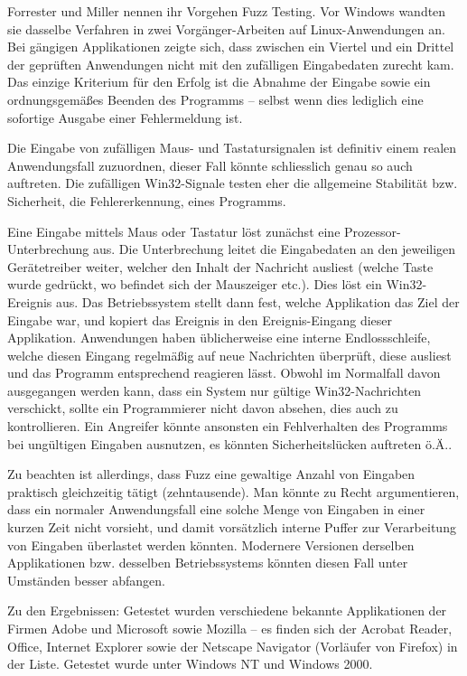 Forrester und Miller nennen ihr Vorgehen \glqq{}Fuzz Testing\grqq{}. Vor Windows wandten sie dasselbe Verfahren
in zwei Vorgänger-Arbeiten auf Linux-Anwendungen an. Bei gängigen Applikationen zeigte sich, dass zwischen
ein Viertel und ein Drittel der geprüften Anwendungen nicht mit den zufälligen Eingabedaten zurecht kam.
Das einzige Kriterium für den \glqq{}Erfolg\grqq{} ist die Abnahme der Eingabe sowie ein ordnungsgemäßes Beenden
des Programms -- selbst wenn dies lediglich eine sofortige Ausgabe einer Fehlermeldung ist.

Die Eingabe von zufälligen Maus- und Tastatursignalen ist definitiv einem realen Anwendungsfall zuzuordnen,
dieser Fall könnte schliesslich genau so auch auftreten. Die zufälligen Win32-Signale testen eher die
allgemeine Stabilität bzw. Sicherheit, die Fehlererkennung, eines Programms.

Eine Eingabe mittels Maus oder Tastatur löst zunächst eine Prozessor-Unterbrechung aus. Die Unterbrechung
leitet die Eingabedaten an den jeweiligen Gerätetreiber weiter, welcher den Inhalt der Nachricht ausliest
(welche Taste wurde gedrückt, wo befindet sich der Mauszeiger etc.). Dies löst ein Win32-Ereignis
aus. Das Betriebssystem stellt dann fest, welche Applikation das Ziel der Eingabe war, und kopiert
das Ereignis in den Ereignis-Eingang dieser Applikation. Anwendungen haben üblicherweise eine interne
Endlossschleife, welche diesen Eingang regelmäßig auf neue Nachrichten überprüft, diese ausliest und das
Programm entsprechend reagieren lässt. Obwohl im Normalfall davon ausgegangen werden kann, dass ein System
nur gültige Win32-Nachrichten verschickt, sollte ein Programmierer nicht davon absehen, dies auch
zu kontrollieren. Ein Angreifer könnte ansonsten ein Fehlverhalten des Programms bei ungültigen Eingaben
ausnutzen, es könnten Sicherheitslücken auftreten ö.Ä..

Zu beachten ist allerdings, dass \glqq{}Fuzz\grqq{} eine gewaltige Anzahl von Eingaben praktisch gleichzeitig tätigt
(zehntausende). Man könnte zu Recht argumentieren, dass ein normaler Anwendungsfall eine solche Menge von
Eingaben in einer kurzen Zeit nicht vorsieht, und damit vorsätzlich interne Puffer zur 
Verarbeitung von Eingaben überlastet werden
könnten. Modernere Versionen derselben Applikationen bzw. desselben Betriebssystems könnten diesen Fall 
unter Umständen besser abfangen.

\vspace{0.5cm}


Zu den Ergebnissen: Getestet wurden verschiedene bekannte Applikationen der Firmen Adobe und Microsoft sowie Mozilla -- es
finden sich der Acrobat Reader, Office, Internet Explorer sowie der Netscape Navigator 
(Vorläufer von Firefox) in der Liste. Getestet wurde unter Windows NT und Windows 2000.

